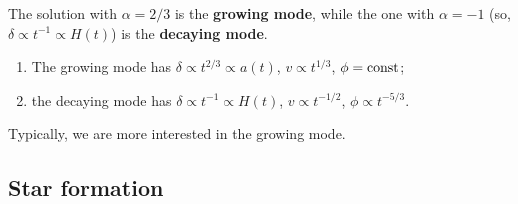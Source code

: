 \documentclass[main.tex]{subfiles}
\begin{document}
The solution with \(\alpha = 2/3\) is the \textbf{growing mode}, while the one with \(\alpha = -1\) (so, \(\delta \propto t^{-1} \propto H(t)\)) is the \textbf{decaying mode}. 

\begin{enumerate}
  \item The growing mode has \(\delta \propto t^{2/3} \propto a(t)\), \(v \propto t^{1/3}\), \(\phi = \text{const}\);
  \item the decaying mode has \(\delta \propto t^{-1} \propto H(t)\), \(v \propto t^{-1/2}\), \(\phi \propto t^{-5/3}\). 
\end{enumerate}

Typically, we are more interested in the growing mode.  


% 


%
\subsection{Star formation}



\end{document}
